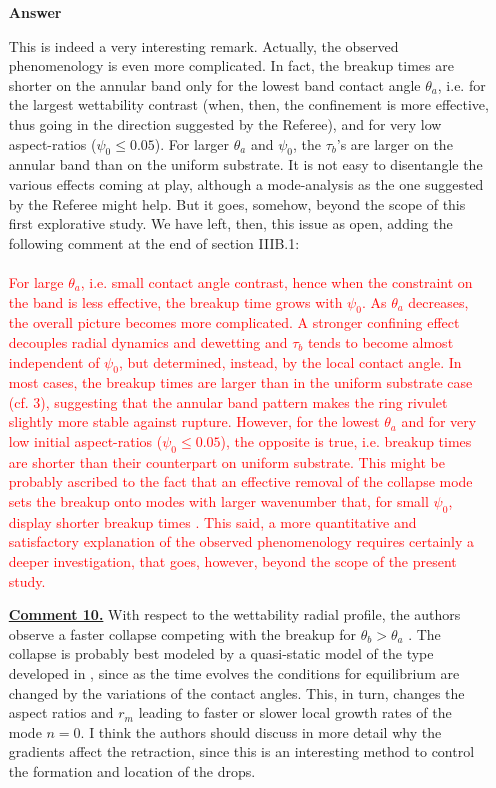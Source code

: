 \documentclass[12pt,english]{article}
\begin{document}
\begin{itemize}
\item[ \textbf{{Answer}}]
{
This is indeed a very interesting remark. Actually, the observed phenomenology is even more complicated. In fact, the breakup times are shorter on the annular band only for the lowest band contact angle $\theta_a$, i.e. for the largest
wettability contrast (when, then, the confinement is more effective, thus 
going in the direction suggested by the Referee), and for very low aspect-ratios ($\psi_0 \leq 0.05$). For larger $\theta_a$ and $\psi_0$, the $\tau_b$'s are larger on the annular band than on the uniform substrate. It is not easy to disentangle 
the various effects coming at play, although a mode-analysis as the one suggested
by the Referee might help. But it goes, somehow, beyond the scope of this first explorative study. 
We have left, then, this issue as open, adding the following comment at the end 
of section IIIB.1:\\
\\
\textcolor{red}{For large $\theta_a$, i.e. small contact angle contrast, hence when the constraint on the band is less effective, the breakup time grows with $\psi_0$. 
As $\theta_a$ decreases, the overall picture becomes more complicated.
A stronger confining effect decouples radial dynamics and dewetting and $\tau_b$ tends to become almost independent of $\psi_0$, but determined, instead, by the local contact angle. 
In most cases, the breakup times are larger than in the uniform substrate case (cf. 3), suggesting that the annular band pattern makes the ring rivulet slightly more stable against rupture. However, for the lowest
$\theta_a$ and for very low initial aspect-ratios ($\psi_0 \leq 0.05$), the opposite is true, i.e. breakup times are shorter than their counterpart on uniform substrate. This might be probably ascribed to the fact that an effective removal of the collapse mode sets the breakup onto modes with larger wavenumber that, for small $\psi_0$, display shorter breakup times \cite{gonzalezStabilityLiquidRing2013}. This said, a more quantitative and satisfactory explanation of the observed phenomenology requires certainly a deeper investigation, that goes, however, beyond the scope of the present study.}

}

\item[ \textbf{\underline{Comment 10.}}]
{
With respect to the wettability radial profile, the authors observe a faster collapse competing with the breakup for $\theta_b>\theta_a$ . The collapse is probably best modeled by a quasi-static model of the type developed in \cite{gonzalezStabilityLiquidRing2013}, since as the time evolves the conditions for equilibrium are changed by the variations of the contact angles. This, in turn, changes the aspect ratios and $r_m$ leading to faster or slower local growth rates of the mode $n=0$. I think the authors should discuss in more detail why the gradients affect the retraction, since this is an interesting method to control the formation and location of the drops. 
}


\end{itemize}
\end{document}
